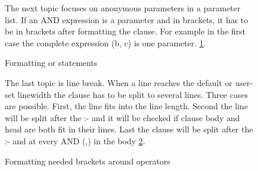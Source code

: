 \documentclass{article}
\begin{document}
\begin{figure}[h] The next topic focuses on anonymous parameters in a parameter list. If an AND expression is a parameter and in brackets, it has to be in brackets after formatting the clause. For example in the first case the complete expression (b, c) is one parameter. \ref{lst:anonymous_tuple}.\\

\begin{minipage}{.5\textwidth}

\end{minipage}
\hfill
\begin{minipage}{.5\textwidth}

\end{minipage}

\caption{Formatting or statements}
\label{lst:anonymous_tuple}
\end{figure}

\begin{figure}[h] The last topic is line break. When a line reaches the default or user-set linewidth the clause has to be split to several lines. Three cases are possible. First, the line fits into the line length. Second the line will be split after the :- and it will be checked if clause body and head are both fit in their lines. Last the clause will be split after the :- and at every AND (,) in the body \ref{lst:line_break}.\\

\begin{minipage}{1\textwidth}

\end{minipage}

\begin{minipage}{1\textwidth}

\end{minipage}

\caption{Formatting needed brackets around operators}
\label{lst:line_break}
\end{figure}
% 
% 
\end{document}
